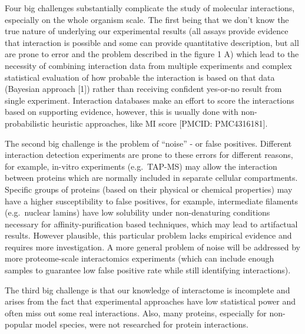 \documentclass[]{article}
\begin{document}
Four big challenges substantially complicate the study of molecular
interactions, especially on the whole organism scale. The first being
that we don't know the true nature of underlying our experimental
results (all assays provide evidence that interaction is possible and
some can provide quantitative description, but all are prone to error
and the problem described in the figure 1 A) which lead to the necessity
of combining interaction data from multiple experiments and complex
statistical evaluation of how probable the interaction is based on that
data (Bayesian approach {[}1{]}) rather than receiving confident
yes-or-no result from single experiment. Interaction databases make an
effort to score the interactions based on supporting evidence, however,
this is usually done with non-probabilistic heuristic approaches, like
MI score {[}PMCID: PMC4316181{]}.

The second big challenge is the problem of ``noise'' - or false
positives. Different interaction detection experiments are prone to
these errors for different reasons, for example, in-vitro experiments
(e.g.~TAP-MS) may allow the interaction between proteins which are
normally included in separate cellular compartments. Specific groups of
proteins (based on their physical or chemical properties) may have a
higher susceptibility to false positives, for example, intermediate
filaments (e.g.~nuclear lamins) have low solubility under non-denaturing
conditions necessary for affinity-purification based techniques, which
may lead to artifactual results. However plausible, this particular
problem lacks empirical evidence and requires more investigation. A more
general problem of noise will be addressed by more proteome-scale
interactomics experiments (which can include enough samples to guarantee
low false positive rate while still identifying interactions).

The third big challenge is that our knowledge of interactome is
incomplete and arises from the fact that experimental approaches have
low statistical power and often miss out some real interactions. Also,
many proteins, especially for non-popular model species, were not
researched for protein interactions.
\end{document}
